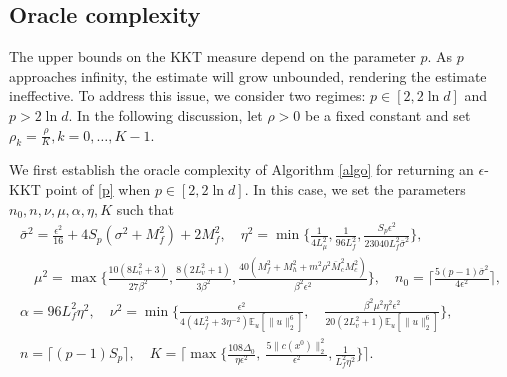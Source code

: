 \documentclass[11pt]{article}
\numberwithin{equation}{section}
\newcommand{\E}{\mathbb{E}}
\newcommand{\be}{\begin{equation}}
\newcommand{\ee}{\end{equation}}
\newcommand{\bee}{\begin{equation*}}
\newcommand{\eee}{\end{equation*}}
\begin{document}
\subsection{Oracle complexity} \label{sec3-2} 
The upper bounds on the KKT measure depend on the parameter \(p\). As $p$ approaches infinity, the estimate will grow unbounded, rendering the estimate ineffective. To address this issue, we consider two regimes: \(p \in [2, 2 \ln d]\) and  \(p > 2 \ln d\). 
In the following discussion, let $\rho>0$ be a fixed constant and set
\(
    \rho_k=\frac{\rho}{K},  k=0,\ldots,K-1. 
\) 

We first establish the oracle complexity of Algorithm \ref{algo} for returning an $\epsilon$-KKT point of \eqref{p} when $p\in {[2,{2\ln d}]}$. In this case, we set
 the parameters $n_0,n,\nu,\mu,\alpha,\eta,K$ such that
\be\label{settings}
\begin{gathered}
\bar{\sigma}^2 = \frac{\epsilon^2}{16} +4S_p(\sigma^2+M_f^2) +2M_f^2, \quad \eta^2 = \min\{ \frac{1}{4L_\mu^2}, \frac{1}{96L_f^2}, \frac{S_p\epsilon^2} {23040L_f^2\bar{\sigma}^2} \},\\
\quad  \mu^2 = \max\{ \frac{10(8L_v^2+3)}{27\beta^2}, \frac{8(2L_v^2+1)}{3\beta^2}, \frac{40(M_f^2+M_h^2+m^2\rho^2\bar{M}_c^2M_c^2)} {\beta^2\epsilon^2} \},  \quad  n_0 = \lceil \frac{5(p-1)\bar{\sigma}^2}{4\epsilon^2} \rceil, \\ 
 \alpha=96L_f^2\eta^2, \quad   \nu^2 = \min\{ \frac{\epsilon^2} {4(4L_f^2+3\eta^{-2})\mathbb{E}_u[\|u\|_2^6]}, \quad  \frac{\beta^2\mu^2\eta^2\epsilon^2} {20(2L_v^2+1)\mathbb{E}_u[\|u\|_2^6]} \}, \\
 n=\lceil(p-1)S_p\rceil, \quad  K = \lceil \max\{ \frac{108\Delta_0}{\eta\epsilon^2}, \ \frac{5\|c(x^0)\|_2^2}{\epsilon^2}, \frac{1}{L_f^2\eta^2} \} \rceil.
 \end{gathered}\ee
 
\end{document}
